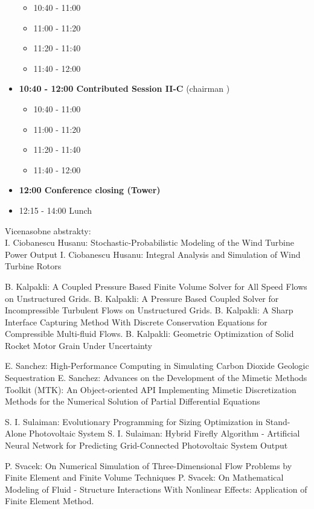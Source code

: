 \documentclass[10pt, A4]{article}%
\begin{document}
\begin{itemize}
  \begin{itemize}
    \item 10:40 - 11:00 
    \item 11:00 - 11:20 
    \item 11:20 - 11:40 
    \item 11:40 - 12:00  
  \end{itemize}
  \item {\bf 10:40 - 12:00 Contributed Session II-C} (chairman ) 
  \begin{itemize}
    \item 10:40 - 11:00 
    \item 11:00 - 11:20 
    \item 11:20 - 11:40 
    \item 11:40 - 12:00 
  \end{itemize}
  \item {\bf 12:00 Conference closing (Tower)}
  \item 12:15 - 14:00 Lunch
\newpage
\end{itemize}



\newpage
Vicenasobne abstrakty:\\
{I. Ciobanescu Husanu}: {Stochastic-Probabilistic Modeling of the Wind Turbine Power Output}
{I. Ciobanescu Husanu}: {Integral Analysis and Simulation of Wind Turbine Rotors}

{B. Kalpakli}: {A Coupled Pressure Based Finite Volume Solver for All Speed Flows on Unstructured Grids.}
{B. Kalpakli}: {A Pressure Based Coupled Solver for Incompressible Turbulent Flows on Unstructured Grids.}
{B. Kalpakli}: {A Sharp Interface Capturing Method With Discrete Conservation Equations for Compressible Multi-fluid Flows.}
{B. Kalpakli}: {Geometric Optimization of Solid Rocket Motor Grain Under Uncertainty}

{E. Sanchez}: {High-Performance Computing in Simulating Carbon Dioxide Geologic Sequestration}
{E. Sanchez}: {Advances on the Development of the Mimetic Methods Toolkit (MTK): An Object-oriented API Implementing Mimetic Discretization Methods for the Numerical Solution of Partial Differential Equations}

{S. I. Sulaiman}: {Evolutionary Programming for Sizing Optimization in Stand-Alone Photovoltaic System}
{S. I. Sulaiman}: {Hybrid Firefly Algorithm - Artificial Neural Network for Predicting Grid-Connected Photovoltaic System Output}

{P. Svacek}: {On Numerical Simulation of Three-Dimensional Flow Problems by Finite Element and Finite Volume Techniques}
{P. Svacek}: {On Mathematical Modeling of Fluid - Structure Interactions With Nonlinear Effects: Application of Finite Element Method.}
\end{document}
